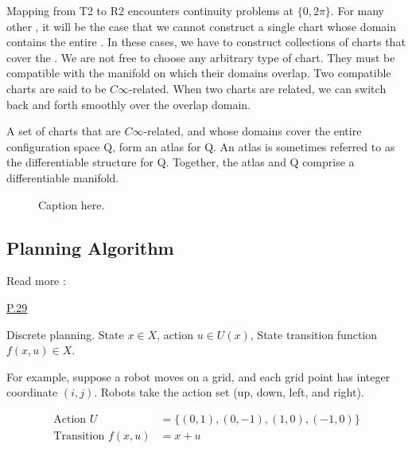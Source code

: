 Mapping from T2 to R2 encounters continuity problems at $\{0, 2\pi\}$. For many other \cs, it will be the case that we cannot construct a single chart whose domain contains the entire \cs. In these cases, we have to construct collections of charts that cover the \cs. We are not free to choose any arbitrary type of chart. They must be compatible with the manifold on which their domains overlap. Two compatible charts are said to be $C\infty$-related. When two charts are related, we can switch back and forth smoothly over the overlap domain.

A set of charts that are $C\infty$-related, and whose domains cover the entire configuration space Q, form an atlas for Q. An atlas is sometimes referred to as the differentiable structure for Q. Together, the atlas and Q comprise a differentiable manifold.

\begin{figure}[htbp]
    \centering
    \caption{Caption here.}
\end{figure}






\subsection{Planning Algorithm}
Read more : \cite{lavalle2006planning}

\noindent \underline{P.29}

Discrete planning. State $x \in X$, action $u \in U(x)$, State transition function $f(x,u) \in X$.

For example, suppose a robot moves on a grid, and each grid point has integer coordinate $(i,j)$. Robots take the action set (up, down, left, and right).

\begin{equation}
    \begin{split}
        \text{Action } U &= \{(0,1),(0,-1),(1,0),(-1,0)\}\\
        \text{Transition } f(x,u) &= x + u
    \end{split}
\end{equation}

